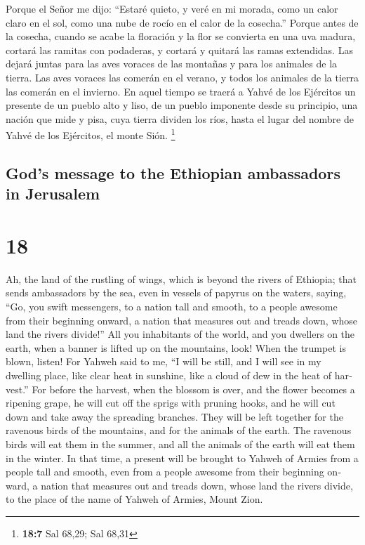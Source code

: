 \begin{paracol}{2}
 Porque el Señor me dijo: ``Estaré quieto, y veré en mi
morada, como un calor claro en el sol, como una nube de rocío en el
calor de la cosecha.''  Porque antes de la cosecha, cuando
se acabe la floración y la flor se convierta en una uva madura, cortará
las ramitas con podaderas, y cortará y quitará las ramas extendidas.
 Las dejará juntas para las aves voraces de las montañas y
para los animales de la tierra. Las aves voraces las comerán en el
verano, y todos los animales de la tierra las comerán en el invierno.
 En aquel tiempo se traerá a Yahvé de los Ejércitos un
presente de un pueblo alto y liso, de un pueblo imponente desde su
principio, una nación que mide y pisa, cuya tierra dividen los ríos,
hasta el lugar del nombre de Yahvé de los Ejércitos, el monte Sión.
\footnote{\textbf{18:7} Sal 68,29; Sal 68,31}

\switchcolumn
\begin{otherlanguage}{english}

\hypertarget{gods-message-to-the-ethiopian-ambassadors-in-jerusalem}{%
\subsection{God's message to the Ethiopian ambassadors in
Jerusalem}\label{gods-message-to-the-ethiopian-ambassadors-in-jerusalem}}

\hypertarget{section-35}{%
\section{18}\label{section-35}}

 Ah, the land of the rustling of wings, which is beyond
the rivers of Ethiopia;  that sends ambassadors by the
sea, even in vessels of papyrus on the waters, saying, ``Go, you swift
messengers, to a nation tall and smooth, to a people awesome from their
beginning onward, a nation that measures out and treads down, whose land
the rivers divide!''  All you inhabitants of the world,
and you dwellers on the earth, when a banner is lifted up on the
mountains, look! When the trumpet is blown, listen!  For
Yahweh said to me, ``I will be still, and I will see in my dwelling
place, like clear heat in sunshine, like a cloud of dew in the heat of
harvest.''  For before the harvest, when the blossom is
over, and the flower becomes a ripening grape, he will cut off the
sprigs with pruning hooks, and he will cut down and take away the
spreading branches.  They will be left together for the
ravenous birds of the mountains, and for the animals of the earth. The
ravenous birds will eat them in the summer, and all the animals of the
earth will eat them in the winter.  In that time, a
present will be brought to Yahweh of Armies from a people tall and
smooth, even from a people awesome from their beginning onward, a nation
that measures out and treads down, whose land the rivers divide, to the
place of the name of Yahweh of Armies, Mount Zion.


\end{otherlanguage}
\end{paracol}
